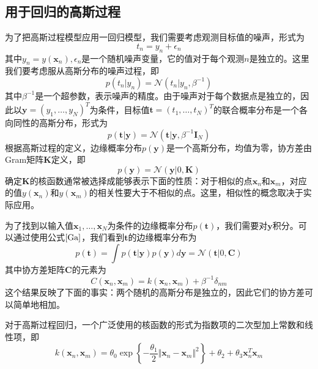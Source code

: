\subsection*{用于回归的高斯过程}
为了把高斯过程模型应用一回归模型，我们需要考虑观测目标值的噪声，形式为
\begin{equation}
	t_n=y_n+\epsilon_n
\end{equation}
其中$y_n=y(\boldsymbol{x}_n),\epsilon_n$是一个随机噪声变量，它的值对于每个观测$n$是独立的。这里我们要考虑服从高斯分布的噪声过程，即
\begin{equation}
	p(t_n|y_n)=\mathcal{N}(t_n|y_n,\beta^{-1})
\end{equation}
其中$\beta^{-1}$是一个超参数，表示噪声的精度。由于噪声对于每个数据点是独立的，因此以$\boldsymbol{y}=(y_1,\dots,y_N)^T$为条件，目标值$\boldsymbol{t}=(t_1,\dots,t_N)^T$的联合概率分布是一个各向同性的高斯分布，形式为
\begin{equation}
	p(\boldsymbol{t}|\boldsymbol{y})=\mathcal{N}(\boldsymbol{t}|\boldsymbol{y},\beta^{-1}\boldsymbol{I}_N)
\end{equation}
根据高斯过程的定义，边缘概率分布$p(\boldsymbol{y})$是一个高斯分布，均值为零，协方差由Gram矩阵$\boldsymbol{K}$定义，即
\begin{equation}
	p(\boldsymbol{y})=\mathcal{N}(\boldsymbol{y}|0,\boldsymbol{K})
\end{equation}
确定$\boldsymbol{K}$的核函数通常被选择成能够表示下面的性质：对于相似的点$\boldsymbol{x}_n$和$\boldsymbol{x}_m$，对应的值$y(\boldsymbol{x}_n)$和$y(\boldsymbol{x}_m)$的相关性要大于不相似的点。这里，相似性的概念取决于实际应用。

为了找到以输入值$\boldsymbol{x}_1,\dots,\boldsymbol{x}_N$为条件的边缘概率分布$p(\boldsymbol{t})$，我们需要对$\boldsymbol{y}$积分。可以通过使用公式$\ref{Ga}$，我们看到$\boldsymbol{t}$的边缘概率分布为
\begin{equation}
	p(\boldsymbol{t})=\int p(\boldsymbol{t}|\boldsymbol{y})p(\boldsymbol{y})d\boldsymbol{y}=\mathcal{N}(\boldsymbol{t}|0,\boldsymbol{C})
\end{equation}
其中协方差矩阵$\boldsymbol{C}$的元素为
\begin{equation}
	C(\boldsymbol{x}_n,\boldsymbol{x}_m)=k(\boldsymbol{x}_n,\boldsymbol{x}_m)+\beta^{-1}\delta_{nm}
\end{equation}
这个结果反映了下面的事实：两个随机的高斯分布是独立的，因此它们的协方差可以简单地相加。

对于高斯过程回归，一个广泛使用的核函数的形式为指数项的二次型加上常数和线性项，即
\begin{equation}
	k(\boldsymbol{x}_n,\boldsymbol{x}_m)=\theta_0\exp\left\{-\frac{\theta_1}{2}\Vert \boldsymbol{x}_n-\boldsymbol{x}_m\Vert ^2 \right\}+\theta_2+\theta_3\boldsymbol{x}^T_n\boldsymbol{x}_m
\end{equation}

